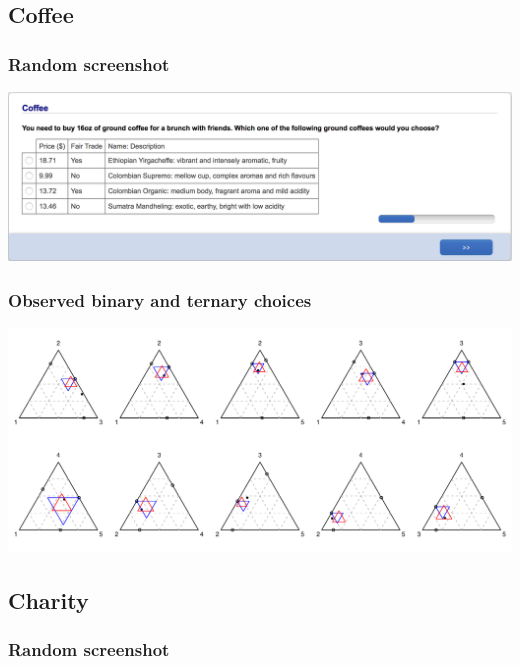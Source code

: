 \documentclass[11pt,letter]{article}
\begin{document}
\pagebreak

\subsection{Coffee}



\subsubsection*{Random screenshot}

\includegraphics[width=15cm]{Population_study_design/screenshot_Coffee.png}

\subsubsection*{Observed binary and ternary choices}

\includegraphics[width=15cm]{./Population_study_data/Simplexes/Coffee.pdf}

\pagebreak

\subsection{Charity}



\subsubsection*{Random screenshot}
\end{document}
